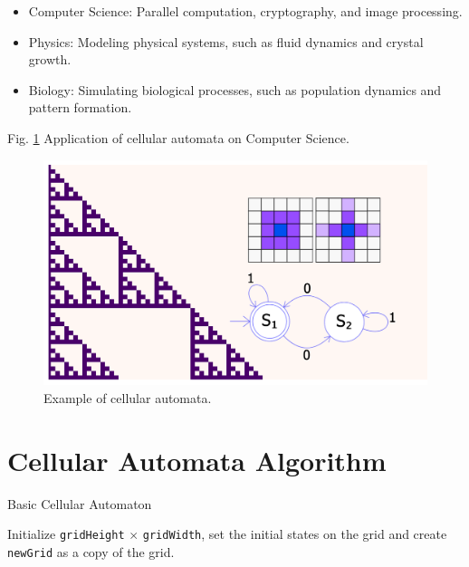 \documentclass[9pt,a4paper,twoside]{tau-class/tau}
\begin{document}
        \begin{itemize}
            \item Computer Science: Parallel computation, cryptography, and image processing.
            \item Physics: Modeling physical systems, such as fluid dynamics and crystal growth.
            \item Biology: Simulating biological processes, such as population dynamics and pattern formation.
        \end{itemize}
		
        Fig. \ref{fig:ExampleAutonoma} Application of cellular automata on Computer Science.
	\begin{figure}[H]
		\centering
		\includegraphics[width=0.75\columnwidth]{figures/theoryOfComputation.png}
		\caption{Example of cellular automata.}
		\label{fig:ExampleAutonoma}
	\end{figure}

\section{Cellular Automata Algorithm}
    \begin{algorithm}
        \caption{Basic Cellular Automaton}
        
        Initialize \texttt{gridHeight} $\times$ \texttt{gridWidth}, set the initial states on the grid and create \texttt{newGrid} as a copy of the grid.\;
        
        \end{algorithm}
\end{document}
